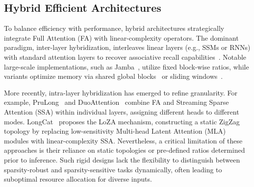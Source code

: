 \subsection{Hybrid Efficient Architectures}
\label{subsec:hybrid_arch}
To balance efficiency with performance, hybrid architectures strategically integrate Full Attention (FA) with linear-complexity operators.
The dominant paradigm, inter-layer hybridization, interleaves linear layers (e.g., SSMs or RNNs) with standard attention layers to recover associative recall capabilities~\citep{ku2025systemsalgorithmsconvolutionalmultihybrid,dao2024transformersssmsgeneralizedmodels}. Notable large-scale implementations, such as Jamba~\citep{lieber2024jambahybridtransformermambalanguage}, utilize fixed block-wise ratios, while variants optimize memory via shared global blocks~\citep{glorioso2024zambacompact7bssm} or sliding windows~\citep{ren2024samba}.

More recently, intra-layer hybridization has emerged to refine granularity. For example, PruLong~\citep{bhaskar2025cache} and DuoAttention~\citep{duoattention} combine FA and Streaming Sparse Attention (SSA) within individual layers, assigning different heads to different modes. LongCat~\citep{zhang2025efficient} proposes the LoZA mechanism, constructing a static ZigZag topology by replacing low-sensitivity Multi-head Latent Attention (MLA) modules with linear-complexity SSA.
Nevertheless, a critical limitation of these approaches is their reliance on static topologies or pre-defined ratios determined prior to inference. Such rigid designs lack the flexibility to distinguish between sparsity-robust and sparsity-sensitive tasks dynamically, often leading to suboptimal resource allocation for diverse inputs.
